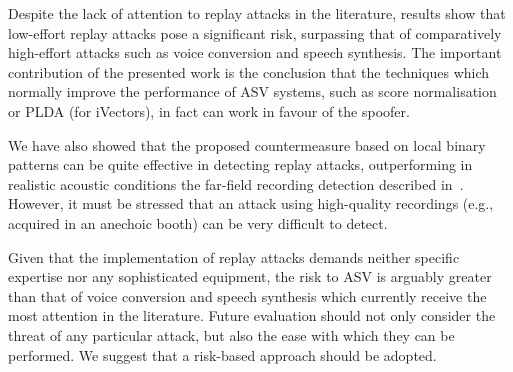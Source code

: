 
Despite the lack of attention to replay attacks in the literature, results show that low-effort replay attacks pose a significant risk, surpassing that of comparatively high-effort attacks such as voice conversion and speech synthesis.
The important contribution of the presented work is the conclusion that the techniques which normally improve the performance of ASV systems, such as score normalisation or PLDA (for iVectors), in fact can work in favour of the spoofer.

We have also showed that the proposed countermeasure based on local binary patterns can be quite effective in detecting replay attacks, outperforming in realistic acoustic conditions the far-field recording detection described in~\cite{Villalba2011}. However, it must be stressed that an attack using high-quality recordings (e.g., acquired in an anechoic booth) can be very difficult to detect.
 

Given that the implementation of replay attacks demands neither specific expertise nor any sophisticated equipment, the risk to ASV is arguably greater than that of voice conversion and speech synthesis which currently receive the most attention in the literature. Future evaluation should not only consider the threat of any particular attack, but also the ease with which they can be performed. We suggest that a risk-based approach should be adopted.
